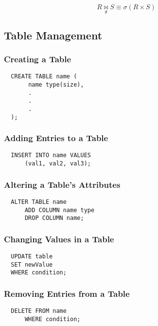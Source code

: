 \documentclass{article}
\begin{document}
\[ R \underset{\theta}{\Join} S \equiv \sigma(R \times S) \]

\subsection{Table Management}

\subsubsection*{Creating a Table}

\begin{lstlisting}
  CREATE TABLE name (
       name type(size),
       .
       .
       .
  );
\end{lstlisting}

\subsubsection*{Adding Entries to a Table}

\begin{lstlisting}
  INSERT INTO name VALUES
      (val1, val2, val3);
\end{lstlisting}

\subsubsection*{Altering a Table's Attributes}

\begin{lstlisting}
  ALTER TABLE name
      ADD COLUMN name type
      DROP COLUMN name;
\end{lstlisting}

\subsubsection*{Changing Values in a Table}

\begin{lstlisting}
  UPDATE table
  SET newValue
  WHERE condition;
\end{lstlisting}

\subsubsection*{Removing Entries from a Table}

\begin{lstlisting}
  DELETE FROM name
      WHERE condition;
\end{lstlisting}
\end{document}
